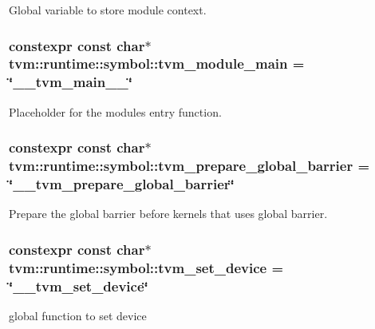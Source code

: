 Global variable to store module context. 

\subsubsection[{\texorpdfstring{tvm\+\_\+module\+\_\+main}{tvm_module_main}}]{\setlength{\rightskip}{0pt plus 5cm}constexpr const char$\ast$ tvm\+::runtime\+::symbol\+::tvm\+\_\+module\+\_\+main = \char`\"{}\+\_\+\+\_\+tvm\+\_\+main\+\_\+\+\_\+\char`\"{}}\hypertarget{namespacetvm_1_1runtime_1_1symbol_abfc81fd15b5d8087b956a8cef4152bf4}{}\label{namespacetvm_1_1runtime_1_1symbol_abfc81fd15b5d8087b956a8cef4152bf4}


Placeholder for the module\textquotesingle{}s entry function. 

\subsubsection[{\texorpdfstring{tvm\+\_\+prepare\+\_\+global\+\_\+barrier}{tvm_prepare_global_barrier}}]{\setlength{\rightskip}{0pt plus 5cm}constexpr const char$\ast$ tvm\+::runtime\+::symbol\+::tvm\+\_\+prepare\+\_\+global\+\_\+barrier = \char`\"{}\+\_\+\+\_\+tvm\+\_\+prepare\+\_\+global\+\_\+barrier\char`\"{}}\hypertarget{namespacetvm_1_1runtime_1_1symbol_af4a5fe87c6e95d6b082a2be1960efbe5}{}\label{namespacetvm_1_1runtime_1_1symbol_af4a5fe87c6e95d6b082a2be1960efbe5}


Prepare the global barrier before kernels that uses global barrier. 

\subsubsection[{\texorpdfstring{tvm\+\_\+set\+\_\+device}{tvm_set_device}}]{\setlength{\rightskip}{0pt plus 5cm}constexpr const char$\ast$ tvm\+::runtime\+::symbol\+::tvm\+\_\+set\+\_\+device = \char`\"{}\+\_\+\+\_\+tvm\+\_\+set\+\_\+device\char`\"{}}\hypertarget{namespacetvm_1_1runtime_1_1symbol_aaad9cf8f51a55b2ec5b19854d692bd21}{}\label{namespacetvm_1_1runtime_1_1symbol_aaad9cf8f51a55b2ec5b19854d692bd21}


global function to set device 


